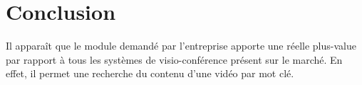 

\section{Conclusion}

Il apparaît que le module demandé par l'entreprise apporte une réelle plus-value par rapport à tous les systèmes de visio-conférence présent sur le marché. En effet, il permet une recherche du contenu d'une vidéo par mot clé.